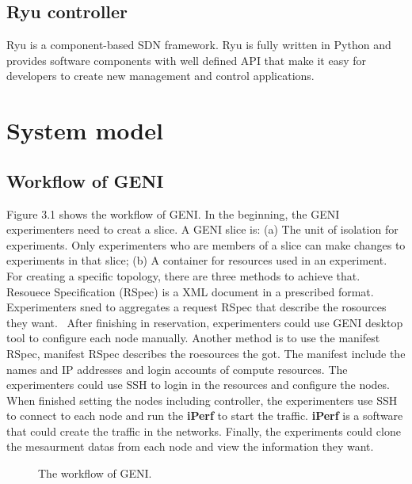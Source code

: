 \documentclass[a4paper,12pt]{report}
\begin{document}
\begin{large}
     \section{Ryu controller}
     \qquad Ryu is a component-based SDN framework. Ryu is fully written in Python and provides software components with well defined API that make it easy for developers to create new management and control applications. 
  \chapter{System model}
     \section{Workflow of GENI}
     \qquad Figure 3.1 shows the workflow of GENI. In the beginning, the GENI experimenters need to creat a slice. A GENI slice is: (a) The unit of isolation for experiments. Only experimenters who are members of a slice can make changes to experiments in that slice; (b) A container for resources used in an experiment.
     \newline
     \null\qquad For creating a specific topology, there are three methods to achieve that. Resouece Specification (RSpec) is a XML document in a prescribed format. Experimenters sned to  aggregates a request RSpec that describe the rosources they want.\
     \newline
     \null\qquad After finishing in reservation, experimenters could use GENI desktop tool to configure each node manually. Another method is to use the manifest RSpec, manifest RSpec describes the roesources the got. The manifest include the names and IP addresses and login accounts of compute resources. The experimenters could use SSH to login in the resources and configure the nodes.
     \newline
     \null\qquad When finished setting the nodes including controller, the experimenters use SSH to connect to each node and run the {\bf iPerf} to start the traffic. {\bf iPerf} is a software that could create the traffic in the networks.
     \newline
     \null\qquad Finally, the experiments could clone the mesaurment datas from each node and view the information they want.
       \begin{figure}
          \caption{The workflow of GENI.}
          \centering

\end{figure}
\end{large}
\end{document}
